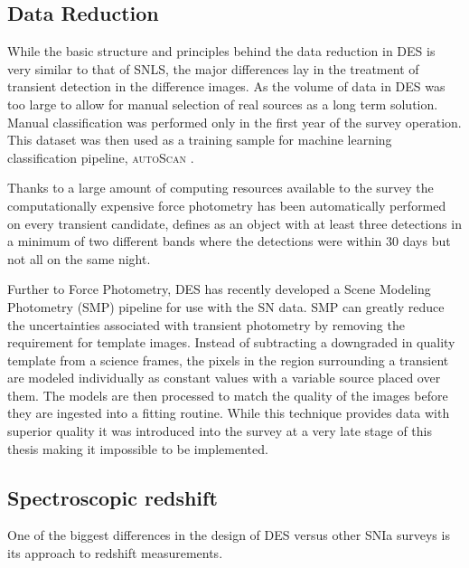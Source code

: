 \subsection{Data Reduction}
While the basic structure and principles behind the data reduction in DES is very similar to that of SNLS, the major differences lay in the treatment of transient detection in the difference images. As the volume of data in DES was too large to allow for manual selection of real sources as a long term solution. Manual classification was performed only in the first year of the survey operation. This dataset was then used as a training sample for machine learning classification pipeline, \textsc{autoScan} \cite{Goldstein2015}.

Thanks to a large amount of computing resources available to the survey the computationally expensive force photometry has been automatically performed on every transient candidate, defines as an object with at least three detections in a minimum of two different bands where the detections were within 30 days but not all on the same night.

Further to Force Photometry, DES has recently developed a Scene Modeling Photometry (SMP) pipeline for use with the SN data. SMP can greatly reduce the uncertainties associated with transient photometry by removing the requirement for template images. Instead of subtracting a downgraded in quality template from a science frames, the pixels in the region surrounding a transient are modeled individually as constant values with a variable source placed over them. The models are then processed to match the quality of the images before they are ingested into a fitting routine. While this technique provides data with superior quality it was introduced into the survey at a very late stage of this thesis making it impossible to be implemented.

\subsection{Spectroscopic redshift}
One of the biggest differences in the design of DES versus other SNIa surveys is its approach to redshift measurements.

